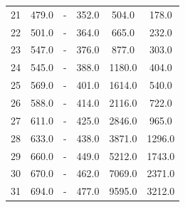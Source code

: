\begin{table}
\begin{tabular}{|l|c|c|c|c|c|}
21 & 479.0 & - & 352.0 & 504.0 & 178.0 \\
22 & 501.0 & - & 364.0 & 665.0 & 232.0 \\
23 & 547.0 & - & 376.0 & 877.0 & 303.0 \\
24 & 545.0 & - & 388.0 & 1180.0 & 404.0 \\
25 & 569.0 & - & 401.0 & 1614.0 & 540.0 \\
26 & 588.0 & - & 414.0 & 2116.0 & 722.0 \\
27 & 611.0 & - & 425.0 & 2846.0 & 965.0 \\
28 & 633.0 & - & 438.0 & 3871.0 & 1296.0 \\
29 & 660.0 & - & 449.0 & 5212.0 & 1743.0 \\
30 & 670.0 & - & 462.0 & 7069.0 & 2371.0 \\
31 & 694.0 & - & 477.0 & 9595.0 & 3212.0 \\

\end{tabular}
\end{table}
